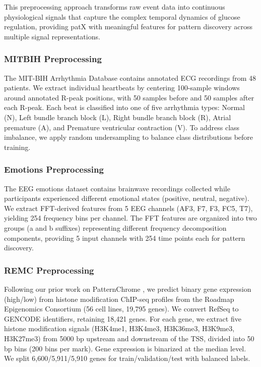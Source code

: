 \documentclass[11pt]{article}
\begin{document}
This preprocessing approach transforms raw event data into continuous physiological signals
that capture the complex temporal dynamics of glucose regulation, providing patX with
meaningful features for pattern discovery across multiple signal representations.

\subsubsection{MITBIH Preprocessing}

The MIT-BIH Arrhythmia Database contains annotated ECG recordings from 48 patients.
We extract individual heartbeats by centering 100-sample windows around annotated
R-peak positions, with 50 samples before and 50 samples after each R-peak.
Each beat is classified into one of five arrhythmia types: Normal (N), Left bundle
branch block (L), Right bundle branch block (R), Atrial premature (A), and
Premature ventricular contraction (V).
To address class imbalance, we apply random undersampling to balance class
distributions before training.

\subsubsection{Emotions Preprocessing}

The EEG emotions dataset contains brainwave recordings collected while participants
experienced different emotional states (positive, neutral, negative).
We extract FFT-derived features from 5 EEG channels (AF3, F7, F3, FC5, T7), yielding
254 frequency bins per channel.
The FFT features are organized into two groups (a and b suffixes) representing
different frequency decomposition components, providing 5 input channels with 254
time points each for pattern discovery.

\subsubsection{REMC Preprocessing}

Following our prior work on PatternChrome \cite{paul2025prediction}, we predict
binary gene expression (high/low) from histone modification ChIP-seq profiles from
the Roadmap Epigenomics Consortium (56 cell lines, 19,795 genes).
We convert RefSeq to GENCODE identifiers, retaining 18,421 genes.
For each gene, we extract five histone modification signals (H3K4me1, H3K4me3,
H3K36me3, H3K9me3, H3K27me3) from 5000 bp upstream and downstream of the TSS,
divided into 50 bp bins (200 bins per mark).
Gene expression is binarized at the median level.
We split 6,600/5,911/5,910 genes for train/validation/test with balanced labels.
\end{document}
